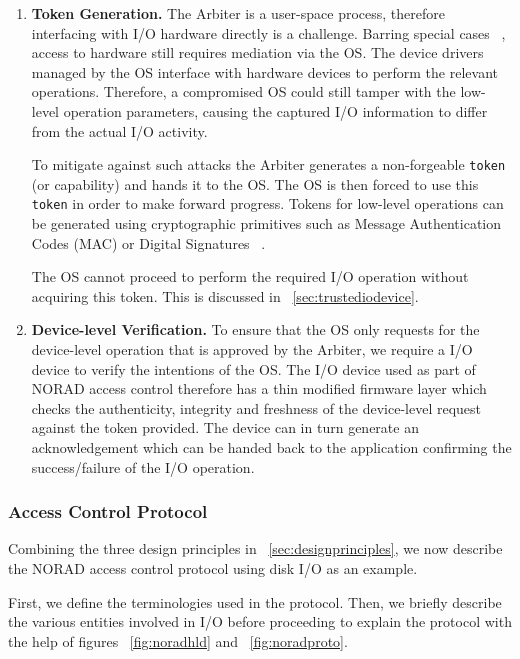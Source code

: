 \documentclass[withindex,glossary]{cam-thesis}
\begin{document}
\begin{enumerate}
\item \textbf{Token Generation.}
The Arbiter is a user-space process, therefore interfacing with I/O hardware directly is a challenge.
Barring special cases ~\cite{kernelbypass, inteldpdk}, access to hardware still requires mediation via the OS.
The device drivers managed by the OS interface with hardware devices to perform the relevant operations.
Therefore, a compromised OS could still tamper with the low-level operation parameters, causing the captured I/O information to differ from the actual I/O activity.

To mitigate against such attacks the Arbiter generates a non-forgeable \texttt{token} (or capability) and hands it to the OS.
The OS is then forced to use this \texttt{token} in order to make forward progress.
Tokens for low-level operations can be generated using cryptographic primitives such as Message Authentication Codes (MAC) or Digital Signatures ~\cite{MAC, DigitalSig}.

The OS cannot proceed to perform the required I/O operation without acquiring this token.
This is discussed in ~\ref{sec:trustediodevice}.

\item \textbf{Device-level Verification.}
To ensure that the OS only requests for the device-level operation that is approved by the Arbiter, we require a I/O device to verify the intentions of the OS.
The I/O device used as part of NORAD access control therefore has a thin modified firmware layer which checks the authenticity, integrity and freshness of the device-level request against the token provided.
The device can in turn generate an acknowledgement which can be handed back to the application confirming the success/failure of the I/O operation.

\end{enumerate}

\subsubsection{Access Control Protocol}
Combining the three design principles in ~\ref{sec:designprinciples}, we now describe the NORAD access control protocol using disk I/O as an example.

First, we define the terminologies used in the protocol.
Then, we briefly describe the various entities involved in I/O before proceeding to explain the protocol with the help of figures ~\ref{fig:noradhld} and ~\ref{fig:noradproto}.
\end{document}
